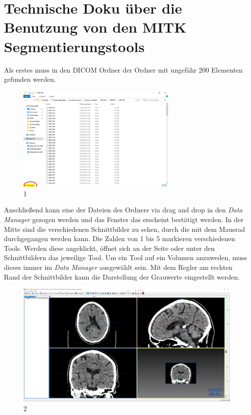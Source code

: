 
\Appendix
\label{ch:Appendix}



\section{Technische Doku über die Benutzung von den MITK Segmentierungstools}

Als erstes muss in den DICOM Ordner der Ordner mit ungefähr 200 Elementen gefunden werden.

\begin{figure}[H] 
\centering 
\includegraphics[width=0.7\textwidth]{Logos/MITK_Doku/1.PNG}
\caption{1} 
\label{fig:eins} 
\end{figure}

Anschließend kann eine der Dateien des Ordners via drag and drop in den \textit{Data Manager} gezogen werden und das Fenster das erscheint bestätigt werden.
\newline
In der Mitte sind die verschiedenen Schnittbilder zu sehen, durch die mit dem Mausrad durchgegangen werden kann.
\newline
Die Zahlen von 1 bis 5 markieren verschiedenen Tools. Werden diese angeklickt, öffnet sich an der Seite oder unter den Schnittbildern das jeweilige Tool. Um ein Tool auf ein Volumen anzuweden, muss dieses immer im \textit{Data Manager} ausgewählt sein.
\newline
Mit dem Regler am rechten Rand der Schnittbilder kann die Darstellung der Grauwerte eingestellt werden.

\begin{figure}[H] 
\centering 
\includegraphics[width=\textwidth]{Logos/MITK_Doku/2.PNG}
\caption{2} 
\label{fig:zwei} 
\end{figure}

